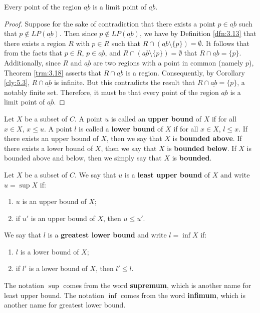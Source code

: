 \documentclass[../main.tex]{subfiles}
\begin{document}
\begin{corollary}\label{cly:5.5}
    Every point of the region $\underline{ab}$ is a limit point of $\underline{ab}$.
    \begin{proof}
        Suppose for the sake of contradiction that there exists a point $p\in\underline{ab}$ such that $p\notin LP(\underline{ab})$. Then since $p\notin LP(\underline{ab})$, we have by Definition \ref{dfn:3.13} that there exists a region $R$ with $p\in R$ such that $R\cap(\underline{ab}\setminus\{p\})=\emptyset$. It follows that from the facts that $p\in R$, $p\in\underline{ab}$, and $R\cap(\underline{ab}\setminus\{p\})=\emptyset$ that $R\cap\underline{ab}=\{p\}$. Additionally, since $R$ and $\underline{ab}$ are two regions with a point in common (namely $p$), Theorem \ref{trm:3.18} asserts that $R\cap\underline{ab}$ is a region. Consequently, by Corollary \ref{cly:5.3}, $R\cap\underline{ab}$ is infinite. But this contradicts the result that $R\cap\underline{ab}=\{p\}$, a notably finite set. Therefore, it must be that every point of the region $\underline{ab}$ is a limit point of $\underline{ab}$.
    \end{proof}
\end{corollary}

\begin{definition}\label{dfn:5.6}
    Let $X$ be a subset of $C$. A point $u$ is called an \textbf{upper bound} of $X$ if for all $x\in X$, $x\leq u$. A point $l$ is called a \textbf{lower bound} of $X$ if for all $x\in X$, $l\leq x$. If there exists an upper bound of $X$, then we say that $X$ is \textbf{bounded above}. If there exists a lower bound of $X$, then we say that $X$ is \textbf{bounded below}. If $X$ is bounded above and below, then we simply say that $X$ is \textbf{bounded}.
\end{definition}

\begin{definition}\label{dfn:5.7}
    Let $X$ be a subset of $C$. We say that $u$ is a \textbf{least upper bound} of $X$ and write $u=\sup X$ if:
    \begin{enumerate}
        \item $u$ is an upper bound of $X$;
        \item if $u'$ is an upper bound of $X$, then $u\leq u'$.
    \end{enumerate}
    We say that $l$ is a \textbf{greatest lower bound} and write $l=\inf X$ if:
    \begin{enumerate}
        \item $l$ is a lower bound of $X$;
        \item if $l'$ is a lower bound of $X$, then $l'\leq l$.
    \end{enumerate}
    The notation $\sup$ comes from the word \textbf{supremum}, which is another name for least upper bound. The notation $\inf$ comes from the word \textbf{infimum}, which is another name for greatest lower bound.
\end{definition}
\end{document}
